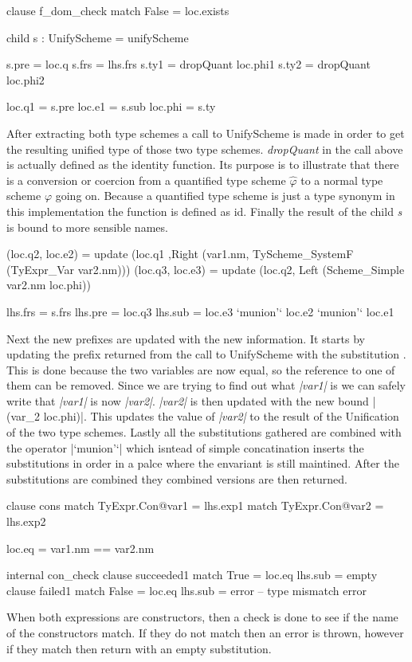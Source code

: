 \begin{code}
clause f_dom_check
  match False = loc.exists
  
  child s : UnifyScheme = unifyScheme
  
  s.pre    = loc.q
  s.frs    = lhs.frs
  s.ty1    = dropQuant loc.phi1
  s.ty2    = dropQuant loc.phi2
           
  loc.q1   = s.pre
  loc.e1   = s.sub
  loc.phi  = s.ty
\end{code}
After extracting both type schemes a call to UnifyScheme is made in order to get the resulting unified type of those two type schemes. \emph{dropQuant} in the call above is actually defined as the identity function. Its purpose is to illustrate that there is a conversion or coercion from a quantified type scheme $\hat{\varphi}$ to a normal type scheme $\varphi$ going on. Because a quantified type scheme is just a type synonym in this implementation the function is defined as id. Finally the result of the child \emph{s} is bound to more sensible names.

\begin{code}                            
(loc.q2, loc.e2)
  = update (loc.q1
           ,Right (var1.nm, TyScheme_SystemF (TyExpr_Var var2.nm)))
(loc.q3, loc.e3) 
  = update (loc.q2, Left (Scheme_Simple var2.nm loc.phi)) 

lhs.frs = s.frs
lhs.pre = loc.q3
lhs.sub = loc.e3 `munion'` loc.e2 `munion'` loc.e1
\end{code}
Next the new prefixes are updated with the new information. It starts by updating the prefix returned from the call to UnifyScheme with the substitution . This is done because the two variables are now equal, so the reference to one of them can be removed. Since we are trying to find out what \emph{|var1|} is we can safely write that \emph{|var1|} is now \emph{|var2|}. \emph{|var2|} is then updated with the new bound |(var_2 \geq loc.phi)|. This updates the value of \emph{|var2|} to the result of the Unification of the two type schemes. Lastly all the substitutions gathered are combined with the operator |`munion'`| which isntead of simple concatination inserts the substitutions in order in a palce where the envariant is still maintined. After the substitutions are combined they combined versions are then returned.

\begin{code}
clause cons
  match TyExpr.Con@var1 = lhs.exp1
  match TyExpr.Con@var2 = lhs.exp2
  
  loc.eq = var1.nm == var2.nm
  
  internal con_check
     clause succeeded1
       match True  = loc.eq
       lhs.sub     = empty
     clause failed1
       match False = loc.eq
       lhs.sub = error -- type mismatch error
\end{code}
When both expressions are constructors, then a check is done to see if the name of the constructors match. If they do not match then an error is thrown, however if they match then return with an empty substitution.

